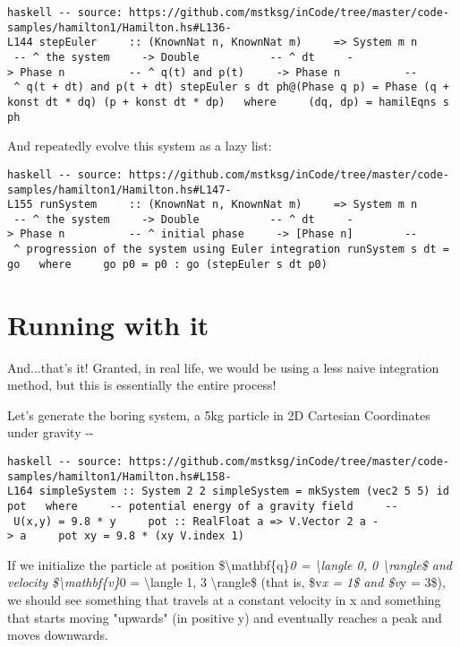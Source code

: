 \documentclass[]{article}
\begin{document}
\texttt{haskell\ -\/-\ source:\ https://github.com/mstksg/inCode/tree/master/code-samples/hamilton1/Hamilton.hs\#L136-L144\ stepEuler\ \ \ \ \ ::\ (KnownNat\ n,\ KnownNat\ m)\ \ \ \ \ =\textgreater{}\ System\ m\ n\ \ \ \ \ \ \ -\/-\ \^{}\ the\ system\ \ \ \ \ -\textgreater{}\ Double\ \ \ \ \ \ \ \ \ \ \ -\/-\ \^{}\ dt\ \ \ \ \ -\textgreater{}\ Phase\ n\ \ \ \ \ \ \ \ \ \ -\/-\ \^{}\ q(t)\ and\ p(t)\ \ \ \ \ -\textgreater{}\ Phase\ n\ \ \ \ \ \ \ \ \ \ -\/-\ \^{}\ q(t\ +\ dt)\ and\ p(t\ +\ dt)\ stepEuler\ s\ dt\ ph@(Phase\ q\ p)\ =\ Phase\ (q\ +\ konst\ dt\ *\ dq)\ (p\ +\ konst\ dt\ *\ dp)\ \ \ where\ \ \ \ \ (dq,\ dp)\ =\ hamilEqns\ s\ ph}

And repeatedly evolve this system as a lazy list:

\texttt{haskell\ -\/-\ source:\ https://github.com/mstksg/inCode/tree/master/code-samples/hamilton1/Hamilton.hs\#L147-L155\ runSystem\ \ \ \ \ ::\ (KnownNat\ n,\ KnownNat\ m)\ \ \ \ \ =\textgreater{}\ System\ m\ n\ \ \ \ \ \ \ -\/-\ \^{}\ the\ system\ \ \ \ \ -\textgreater{}\ Double\ \ \ \ \ \ \ \ \ \ \ -\/-\ \^{}\ dt\ \ \ \ \ -\textgreater{}\ Phase\ n\ \ \ \ \ \ \ \ \ \ -\/-\ \^{}\ initial\ phase\ \ \ \ \ -\textgreater{}\ {[}Phase\ n{]}\ \ \ \ \ \ \ \ -\/-\ \^{}\ progression\ of\ the\ system\ using\ Euler\ integration\ runSystem\ s\ dt\ =\ go\ \ \ where\ \ \ \ \ go\ p0\ =\ p0\ :\ go\ (stepEuler\ s\ dt\ p0)}

\section{Running with it}

And...that's it! Granted, in real life, we would be using a less naive
integration method, but this is essentially the entire process!

Let's generate the boring system, a 5kg particle in 2D Cartesian Coordinates
under gravity -\/-

\texttt{haskell\ -\/-\ source:\ https://github.com/mstksg/inCode/tree/master/code-samples/hamilton1/Hamilton.hs\#L158-L164\ simpleSystem\ ::\ System\ 2\ 2\ simpleSystem\ =\ mkSystem\ (vec2\ 5\ 5)\ id\ pot\ \ \ where\ \ \ \ \ -\/-\ potential\ energy\ of\ a\ gravity\ field\ \ \ \ \ -\/-\ U(x,y)\ =\ 9.8\ *\ y\ \ \ \ \ pot\ ::\ RealFloat\ a\ =\textgreater{}\ V.Vector\ 2\ a\ -\textgreater{}\ a\ \ \ \ \ pot\ xy\ =\ 9.8\ *\ (xy\ \textasciigrave{}V.index\textasciigrave{}\ 1)}

If we initialize the particle at position \$\textbackslash{}mathbf\{q\}\emph{0 =
\textbackslash{}langle 0, 0 \textbackslash{}rangle\$ and velocity
\$\textbackslash{}mathbf\{v\}}0 = \textbackslash{}langle 1, 3
\textbackslash{}rangle\$ (that is, \$v\emph{x = 1\$ and \$v}y = 3\$), we should
see something that travels at a constant velocity in x and something that starts
moving "upwards" (in positive y) and eventually reaches a peak and moves
downwards.
\end{document}
